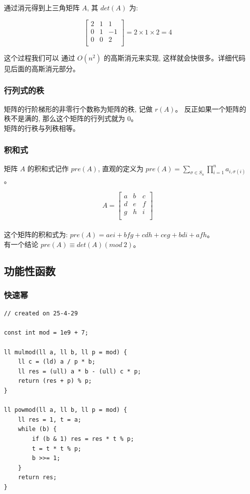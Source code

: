 \documentclass[a4paper,12pt]{article}
\begin{document}
\noindent 通过消元得到上三角矩阵 $A$, 其 $det(A)$ 为:

$$\begin{bmatrix}
2&1&1\\
0&1&-1\\
0&0&2\\
\end{bmatrix} = 2 \times 1 \times 2 = 4$$

\noindent 这个过程我们可以 通过 $O(n^2)$ 的高斯消元来实现, 这样就会快很多。详细代码见后面的高斯消元部分。

\subsubsection{行列式的秩}

\noindent 矩阵的行阶梯形的非零行个数称为矩阵的秩, 记做 $r(A)$。
反正如果一个矩阵的秩不是满的, 那么这个矩阵的行列式就为 $0$。\\

\noindent 矩阵的行秩与列秩相等。

\subsubsection{积和式}

\noindent 矩阵 $A$ 的积和式记作 $pre(A)$, 直观的定义为 $pre(A) = \sum_{\sigma \in S_n} \prod_{i=1}^n a_{i,\sigma(i)}$。

$$A = \begin{bmatrix}
a&b&c\\
d&e&f\\
g&h&i\\
\end{bmatrix}$$
\\
\noindent 这个矩阵的积和式为: $pre(A) = aei + bfg + cdh + ceg + bdi + afh$。\\

\noindent 有一个结论 $pre(A) \equiv det(A) (mod \ 2)$。

\subsection{功能性函数}

\subsubsection{快速幂}

\begin{lstlisting}
// created on 25-4-29

const int mod = 1e9 + 7;

ll mulmod(ll a, ll b, ll p = mod) {
	ll c = (ld) a / p * b;
	ll res = (ull) a * b - (ull) c * p;
	return (res + p) % p;
}

ll powmod(ll a, ll b, ll p = mod) {
	ll res = 1, t = a;
	while (b) {
		if (b & 1) res = res * t % p;
		t = t * t % p;
		b >>= 1;
	}
	return res;
}
\end{lstlisting}
\end{document}

